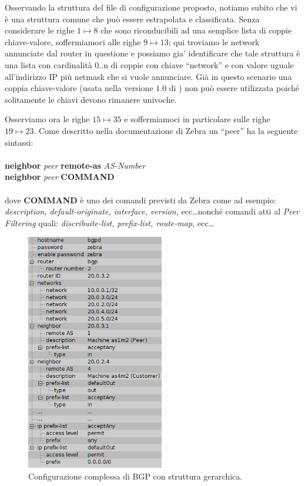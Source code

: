 Osservando la struttura del file di configurazione proposto, notiamo subito che vi è una struttura comune che può essere estrapolata e classificata. Senza considerare le righe $1\mapsto8$ che sono riconducibili ad una semplice lista di coppie chiave-valore, soffermiamoci alle righe $9\mapsto13$; qui troviamo le network annunciate dal router in questione e possiamo gia' identificare che tale struttura è una lista con cardinalità 0..n di coppie con chiave ``network'' e con valore uguale all'indirizzo IP più netmask che si vuole annunciare. Già in questo scenario una coppia chiave-valore (usata nella versione $1.0$ di \visualnetkit{}) non può essere utilizzata poiché solitamente le chiavi devono rimanere univoche.

Osserviamo ora le righe $15\mapsto35$ e soffermiamoci in particolare sulle righe $19\mapsto23$. Come descritto nella documentazione di Zebra\cite{ZEBRADOC} un ``peer'' ha la seguente sintassi:
\\
\\
\textbf{neighbor} \textit{peer} \textbf{remote-as} \textit{AS-Number}
\\
\textbf{neighbor} \textit{peer} \textbf{COMMAND}
\\
\\
dove \textbf{COMMAND} è uno dei comandi previsti da Zebra come ad esempio: \emph{description, default-originate, interface, version,} ecc\ldots nonché comandi atti al \emph{Peer Filtering} quali: \emph{discribuite-list, prefix-list, route-map,} ecc\ldots

\begin{figure}[!htb]
	\centering
	\includegraphics[width=6cm]{images/bgp_conf_tree.png}
	\caption{Configurazione complessa di BGP con struttura gerarchica.}
	\label{figura:bgp_conf_tree}
\end{figure}

